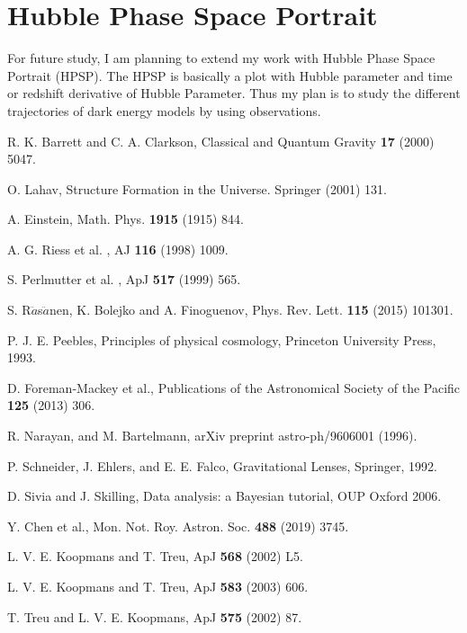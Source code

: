 \documentclass[12pt]{report}
\begin{document}
\section{Hubble Phase Space Portrait}
For future study, I am planning to extend my work with Hubble Phase Space Portrait (HPSP). The HPSP is basically a plot with Hubble parameter and time or redshift derivative of Hubble Parameter. Thus my plan is to study the different trajectories of dark energy models by using observations.
\newpage
{}
\begin{thebibliography}{99}

 R. K. Barrett and C. A. Clarkson,  Classical and Quantum Gravity \textbf{17} (2000) 5047.

  O. Lahav, Structure Formation in the Universe. Springer  (2001) 131.

 A. Einstein, Math. Phys. \textbf{1915} (1915) 844.

 A. G. Riess  et al. ,  AJ \textbf{116} (1998) 1009.

 S. Perlmutter et al. ,  ApJ \textbf{517} (1999) 565.

 S. R$\ddot{a}$s$\ddot{a}$nen, K. Bolejko and A. Finoguenov,  Phys. Rev. Lett. \textbf{115} (2015) 101301.

 P. J. E. Peebles, Principles of physical cosmology, Princeton University Press, 1993.

 D. Foreman-Mackey et al., Publications of the Astronomical Society of the Pacific \textbf{125} (2013) 306.

  R. Narayan, and M. Bartelmann,  arXiv preprint astro-ph/9606001 (1996).

 P. Schneider, J. Ehlers, and E. E. Falco, Gravitational Lenses, Springer, 1992.

  D. Sivia and  J. Skilling, Data analysis: a Bayesian tutorial, OUP Oxford 2006.

 Y. Chen et al.,  Mon. Not. Roy. Astron. Soc. \textbf{488} (2019) 3745.

 L. V. E.  Koopmans and T. Treu,  ApJ \textbf{568} (2002) L5.

 L. V. E.  Koopmans and T. Treu,  ApJ \textbf{583} (2003) 606.

 T. Treu and L. V. E. Koopmans,  ApJ \textbf{575} (2002) 87.


\end{thebibliography}
\end{document}
